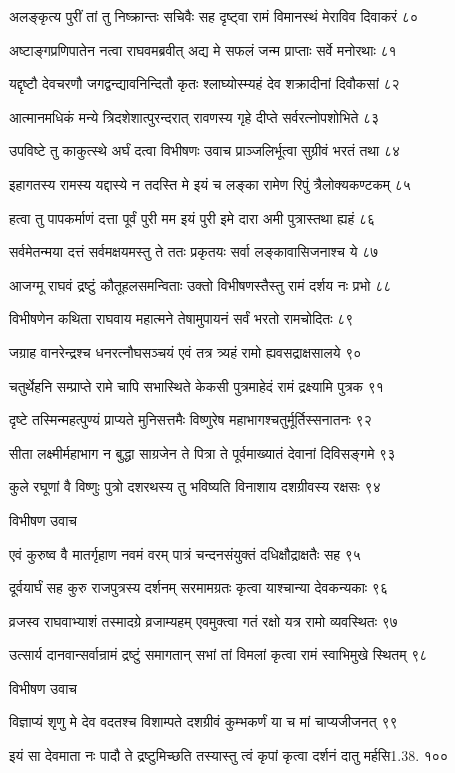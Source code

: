 अलङ्कृत्य पुरीं तां तु निष्क्रान्तः सचिवैः सह
दृष्ट्वा रामं विमानस्थं मेराविव दिवाकरं ८०

अष्टाङ्गप्रणिपातेन नत्वा राघवमब्रवीत्
अद्य मे सफलं जन्म प्राप्ताः सर्वे मनोरथाः ८१

यद्दृष्टौ देवचरणौ जगद्वन्द्यावनिन्दितौ
कृतः श्लाघ्योस्म्यहं देव शक्रादीनां दिवौकसां ८२

आत्मानमधिकं मन्ये त्रिदशेशात्पुरन्दरात्
रावणस्य गृहे दीप्ते सर्वरत्नोपशोभिते ८३

उपविष्टे तु काकुत्स्थे अर्घं दत्वा विभीषणः
उवाच प्राञ्जलिर्भूत्वा सुग्रीवं भरतं तथा ८४

इहागतस्य रामस्य यद्दास्ये न तदस्ति मे
इयं च लङ्का रामेण रिपुं त्रैलोक्यकण्टकम् ८५

हत्वा तु पापकर्माणं दत्ता पूर्वं पुरी मम
इयं पुरी इमे दारा अमी पुत्रास्तथा ह्यहं ८६

सर्वमेतन्मया दत्तं सर्वमक्षयमस्तु ते
ततः प्रकृतयः सर्वा लङ्कावासिजनाश्च ये ८७

आजग्मू राघवं द्रष्टुं कौतूहलसमन्विताः
उक्तो विभीषणस्तैस्तु रामं दर्शय नः प्रभो ८८

विभीषणेन कथिता राघवाय महात्मने
तेषामुपायनं सर्वं भरतो रामचोदितः ८९

जग्राह वानरेन्द्रश्च धनरत्नौघसञ्चयं
एवं तत्र त्र्यहं रामो ह्यवसद्राक्षसालये ९०

चतुर्थेहनि सम्प्राप्ते रामे चापि सभास्थिते
केकसी पुत्रमाहेदं रामं द्रक्ष्यामि पुत्रक ९१

दृष्टे तस्मिन्महत्पुण्यं प्राप्यते मुनिसत्तमैः
विष्णुरेष महाभागश्चतुर्मूर्तिस्सनातनः ९२

सीता लक्ष्मीर्महाभाग न बुद्धा साग्रजेन ते
पित्रा ते पूर्वमाख्यातं देवानां दिविसङ्गमे ९३

कुले रघूणां वै विष्णुः पुत्रो दशरथस्य तु
भविष्यति विनाशाय दशग्रीवस्य रक्षसः ९४

विभीषण उवाच

एवं कुरुष्व वै मातर्गृहाण नवमं वरम्
पात्रं चन्दनसंयुक्तं दधिक्षौद्राक्षतैः सह ९५

दूर्वयार्घं सह कुरु राजपुत्रस्य दर्शनम्
सरमामग्रतः कृत्वा याश्चान्या देवकन्यकाः ९६

व्रजस्व राघवाभ्याशं तस्मादग्रे व्रजाम्यहम्
एवमुक्त्वा गतं रक्षो यत्र रामो व्यवस्थितः ९७

उत्सार्य दानवान्सर्वान्रामं द्रष्टुं समागतान्
सभां तां विमलां कृत्वा रामं स्वाभिमुखे स्थितम् ९८

विभीषण उवाच

विज्ञाप्यं शृणु मे देव वदतश्च विशाम्पते
दशग्रीवं कुम्भकर्णं या च मां चाप्यजीजनत् ९९

इयं सा देवमाता नः पादौ ते द्रष्टुमिच्छति
तस्यास्तु त्वं कृपां कृत्वा दर्शनं दातु मर्हसि1.38. १००

